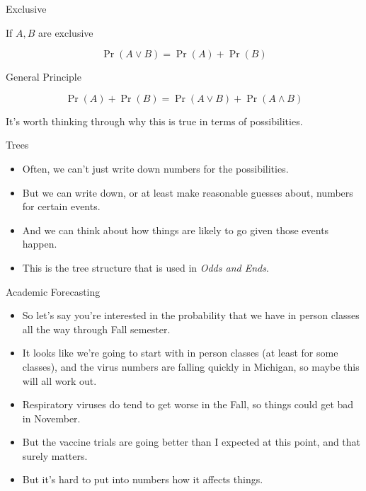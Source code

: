 \documentclass[
  ignorenonframetext,
]{beamer}
\providecommand{\tightlist}{%
  \setlength{\itemsep}{0pt}\setlength{\parskip}{0pt}}
\renewcommand{\,}{\text{, }}
\begin{document}
\begin{frame}{Exclusive}
\protect\hypertarget{exclusive}{}

If \(A, B\) are exclusive

\[
\Pr(A \vee B) = \Pr(A) + \Pr(B)
\]

\end{frame}

\begin{frame}{General Principle}
\protect\hypertarget{general-principle}{}

\[
\Pr(A) + \Pr(B) = \Pr(A \vee B) + \Pr(A \wedge B)
\]

\pause

It's worth thinking through why this is true in terms of possibilities.

\end{frame}

\begin{frame}{Trees}
\protect\hypertarget{trees}{}

\begin{itemize}
\tightlist
\item
  Often, we can't just write down numbers for the possibilities.
\item
  But we can write down, or at least make reasonable guesses about,
  numbers for certain events.
\item
  And we can think about how things are likely to go given those events
  happen.
\item
  This is the tree structure that is used in \emph{Odds and Ends}.
\end{itemize}

\end{frame}

\begin{frame}{Academic Forecasting}
\protect\hypertarget{academic-forecasting}{}

\begin{itemize}
\tightlist
\item
  So let's say you're interested in the probability that we have in
  person classes all the way through Fall semester.
\item
  It looks like we're going to start with in person classes (at least
  for some classes), and the virus numbers are falling quickly in
  Michigan, so maybe this will all work out.
\item
  Respiratory viruses do tend to get worse in the Fall, so things could
  get bad in November.
\item
  But the vaccine trials are going better than I expected at this point,
  and that surely matters.
\item
  But it's hard to put into numbers how it affects things.
\end{itemize}

\end{frame}
\end{document}
